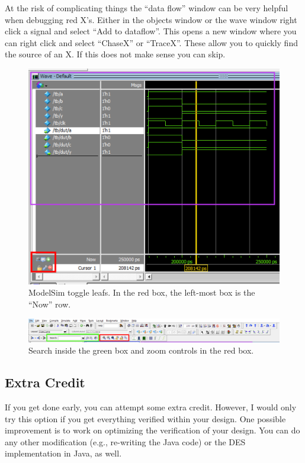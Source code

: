 \documentclass{article}
\begin{document}
At the risk of complicating things the ``data flow'' window can be very
helpful when debugging red X's.  Either in the objects window or the wave
window right click a signal and select ``Add to dataflow''. This opens
a new window where you can right click and select ``ChaseX'' or ``TraceX''.
These allow you to quickly find the source of an X.  If this does not make
sense you can skip.
\begin{figure} [t!]
  \centering
  \includegraphics[scale=0.4]{modelsim-tips1.png}
  \caption{ModelSim toggle leafs. In the red box, the left-most box is the ``Now'' row.}
  \label{modelsim-tips1.png}
\end{figure}
\begin{figure} [t!]
  \centering
  \includegraphics[scale=0.32]{modelsim-tips2.png}
  \caption{Search inside the green box and zoom controls in the red box.}
  \label{modelsim-tips2.png}
\end{figure}

\subsection{Extra Credit}

If you get done early, you can attempt some extra credit.  However, I
would only try this option if you get everything verified within your
design.  
One possible improvement is to work on optimizing the verification
of your design.  You can do any other modification (e.g., re-writing
the Java code) or the DES implementation in Java, as well.
\end{document}
